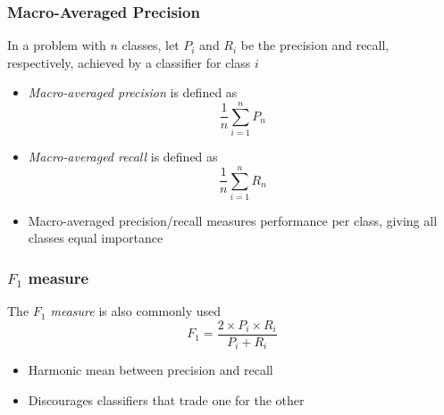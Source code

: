 \documentclass[svgnames]{beamer}
\begin{document}

\begin{frame} \frametitle{Macro-Averaged Precision}
  
 In a problem with $n$ classes, let $P_i$ and $R_i$ be the precision and
 recall, respectively, achieved by a classifier for class $i$
 \begin{itemize}
 \item \emph{Macro-averaged precision} is defined as
   \begin{displaymath}
     \frac{1}{n}\sum_{i=1}^n P_n
   \end{displaymath}
 \item \emph{Macro-averaged recall} is defined as
   \begin{displaymath}
     \frac{1}{n}\sum_{i=1}^n R_n
   \end{displaymath}
 \end{itemize}

 \begin{itemize}
 \item Macro-averaged precision/recall measures performance per class, giving
   all classes equal importance
 \end{itemize}
\end{frame}


\begin{frame} \frametitle{$F_1$ measure}
  
    The \emph{$F_1$ measure} is also commonly used
    \begin{displaymath}
        F_1 = \frac{2 \times P_i \times R_i}{P_i + R_i}
    \end{displaymath}

    \begin{itemize}
    \item Harmonic mean between precision and recall
    \item Discourages classifiers that trade one for the other
    \end{itemize}

\end{frame}



\end{document}
